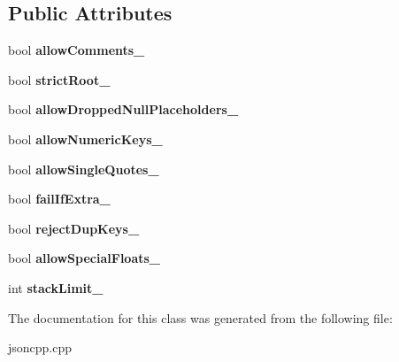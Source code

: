 \subsection*{Public Attributes}
\begin{DoxyCompactItemize}
\item 
\hypertarget{class_json_1_1_our_features_ac71bb7ba7363d3b05ed76602b036ce33}{bool {\bfseries allow\-Comments\-\_\-}}\label{class_json_1_1_our_features_ac71bb7ba7363d3b05ed76602b036ce33}

\item 
\hypertarget{class_json_1_1_our_features_a2095f66a776c0a4ae6cc931a0c94242e}{bool {\bfseries strict\-Root\-\_\-}}\label{class_json_1_1_our_features_a2095f66a776c0a4ae6cc931a0c94242e}

\item 
\hypertarget{class_json_1_1_our_features_a13963bc44bf948eec1968f7ff8e8f5f1}{bool {\bfseries allow\-Dropped\-Null\-Placeholders\-\_\-}}\label{class_json_1_1_our_features_a13963bc44bf948eec1968f7ff8e8f5f1}

\item 
\hypertarget{class_json_1_1_our_features_af6973fc7e774ce2d634ba99442aeb91a}{bool {\bfseries allow\-Numeric\-Keys\-\_\-}}\label{class_json_1_1_our_features_af6973fc7e774ce2d634ba99442aeb91a}

\item 
\hypertarget{class_json_1_1_our_features_abbd6c196d7a22e2a360a59887eda4610}{bool {\bfseries allow\-Single\-Quotes\-\_\-}}\label{class_json_1_1_our_features_abbd6c196d7a22e2a360a59887eda4610}

\item 
\hypertarget{class_json_1_1_our_features_ae8ad25b90706c78f1a8fe929191ac61b}{bool {\bfseries fail\-If\-Extra\-\_\-}}\label{class_json_1_1_our_features_ae8ad25b90706c78f1a8fe929191ac61b}

\item 
\hypertarget{class_json_1_1_our_features_a39b8e0b86b1c24a45e800c023bb715aa}{bool {\bfseries reject\-Dup\-Keys\-\_\-}}\label{class_json_1_1_our_features_a39b8e0b86b1c24a45e800c023bb715aa}

\item 
\hypertarget{class_json_1_1_our_features_af760f91cc2a7af37e44f78fb466061bb}{bool {\bfseries allow\-Special\-Floats\-\_\-}}\label{class_json_1_1_our_features_af760f91cc2a7af37e44f78fb466061bb}

\item 
\hypertarget{class_json_1_1_our_features_a9a786713902d14be6d57a08cc03ccfff}{int {\bfseries stack\-Limit\-\_\-}}\label{class_json_1_1_our_features_a9a786713902d14be6d57a08cc03ccfff}

\end{DoxyCompactItemize}


The documentation for this class was generated from the following file\-:\begin{DoxyCompactItemize}
\item 
jsoncpp.\-cpp\end{DoxyCompactItemize}
